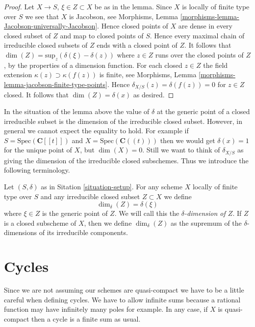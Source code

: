 \begin{proof}
Let $X \to S$, $\xi \in Z \subset X$ be as in the lemma.
Since $X$ is locally of finite type over $S$ we see that
$X$ is Jacobson, see
Morphisms, Lemma \ref{morphisms-lemma-Jacobson-universally-Jacobson}.
Hence closed points of $X$ are dense in every closed subset of $Z$
and map to closed points of $S$. Hence every maximal chain
of irreducible closed subsets of $Z$ ends with a closed point of $Z$.
It follows that $\dim(Z) = \text{sup}_z(\delta(\xi) - \delta(z))$
where $z \in Z$ runs over the closed points of $Z$, by the properties
of a dimension function. For each closed $z \in Z$ the field extension
$\kappa(z) \supset \kappa(f(z))$ is finite, see Morphisms,
Lemma \ref{morphisms-lemma-jacobson-finite-type-points}.
Hence $\delta_{X/S}(z) = \delta(f(z)) = 0$ for $z \in Z$ closed.
It follows that $\dim(Z) = \delta(x)$ as desired.
\end{proof}

\noindent
In the situation of the lemma above the
value of $\delta$ at the generic point of a closed irreducible subset
is the dimension of the irreducible closed subset.
However, in general we cannot expect the equality to hold.
For example if $S = \text{Spec}(\mathbf{C}[[t]])$ and
$X = \text{Spec}(\mathbf{C}((t)))$ then we would get
$\delta(x) = 1$ for the unique point of $X$, but $\dim(X) = 0$.
Still we want to think of $\delta_{X/S}$ as giving the
dimension of the irreducible closed subschemes. Thus we introduce
the following terminology.

\begin{definition}
\label{definition-delta-dimension}
Let $(S, \delta)$ as in Sitation \ref{situation-setup}.
For any scheme $X$ locally of finite type over $S$
and any irreducible closed subset $Z \subset X$ we define
$$
\dim_\delta(Z) = \delta(\xi)
$$
where $\xi \in Z$ is the generic point of $Z$.
We will call this the {\it $\delta$-dimension of $Z$}.
If $Z$ is a closed subscheme of $X$, then we define
$\dim_\delta(Z)$ as the supremum of the $\delta$-dimensions
of its irreducible components.
\end{definition}







\section{Cycles}
\label{section-cycles}

\noindent
Since we are not assuming our schemes are quasi-compact we have
to be a little careful when defining cycles. We have to allow
infinite sums because a rational function may have infinitely many
poles for example. In any case, if $X$ is quasi-compact then a
cycle is a finite sum as usual.

